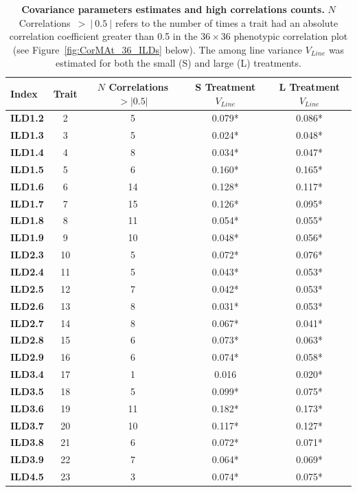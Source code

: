 {\renewcommand{\arraystretch}{1.05}}
\begin{table}[!h]
\caption[Covariance parameters estimates and high correlations counts.]{\textbf{Covariance parameters estimates and high correlations counts.} $N$ Correlations~$>~\left|~0.5~\right|$ refers to the number of times a trait had an absolute correlation coefficient greater than 0.5 in the $36 \times 36$ phenotypic correlation plot (see Figure~\ref{fig:CorMAt_36_ILDs} below). The among line variance $V_{Line}$ was estimated for both the small (S) and large (L) treatments.}
\small
\begin{center}
\begin{tabular}{>{\bfseries}lccS[table-format=1.4]S[table-format=1.4]}
\toprule
Index & Trait & {$N$ Correlations $>\left| 0.5 \right|$} & {S Treatment $V_{Line}$ } & {L Treatment $V_{Line}$ } \\
\midrule
ILD1.2 & 2 & 5 & 0.079* & 0.086*\\
ILD1.3 & 3 & 5 & 0.024* & 0.048*\\
ILD1.4 & 4 & 8 & 0.034* & 0.047*\\
ILD1.5 & 5 & 6 & 0.160* & 0.165*\\
ILD1.6 & 6 & 14 & 0.128* & 0.117*\\
ILD1.7 & 7 & 15 & 0.126* & 0.095*\\
ILD1.8 & 8 & 11 & 0.054* & 0.055*\\
ILD1.9 & 9 & 10 & 0.048* & 0.056*\\
ILD2.3 & 10 & 5 & 0.072* & 0.076*\\
ILD2.4 & 11 & 5 & 0.043* & 0.053*\\
ILD2.5 & 12 & 7 & 0.042* & 0.053*\\
ILD2.6 & 13 & 8 & 0.031* & 0.053*\\
ILD2.7 & 14 & 8 & 0.067* & 0.041*\\
ILD2.8 & 15 & 6 & 0.073* & 0.063*\\
ILD2.9 & 16 & 6 & 0.074* & 0.058*\\
ILD3.4 & 17 & 1 & 0.016 & 0.020*\\
ILD3.5 & 18 & 5 & 0.099* & 0.075*\\
ILD3.6 & 19 & 11 & 0.182* & 0.173*\\
ILD3.7 & 20 & 10 & 0.117* & 0.127*\\
ILD3.8 & 21 & 6 & 0.072* & 0.071*\\
ILD3.9 & 22 & 7 & 0.064* & 0.069*\\
ILD4.5 & 23 & 3 & 0.074* & 0.075*\\

\end{tabular}
\end{center}
\end{table}
